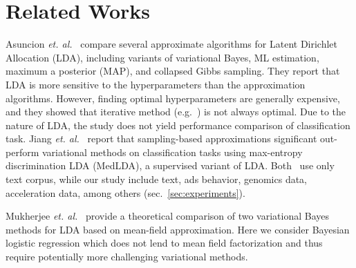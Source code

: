 \section{Related Works}

Asuncion {\it et. al.}~\cite{Asuncion2009smoothing} compare several
approximate algorithms for Latent Dirichlet Allocation (LDA), including
variants of variational Bayes, ML estimation, maximum a posterior (MAP), and
collapsed Gibbs sampling. They report that LDA is more sensitive to the
hyperparameters than the approximation algorithms. However, finding optimal
hyperparameters are generally expensive, and they showed that iterative method
(e.g.~\cite{Minka00}) is not always optimal. Due to the nature of LDA, the
study does not yield performance comparison of classification task. Jiang {\it
et. al.}~\cite{medlda_MCMC12} report that sampling-based approximations
significant out-perform variational methods on classification tasks using
max-entropy discrimination LDA (MedLDA), a supervised variant of LDA.
Both~\cite{Asuncion2009smoothing, medlda_MCMC12} use only text corpus, while
our study include text, ads behavior, genomics data, acceleration data, among
others (sec.~\ref{sec:experiments}). 

Mukherjee {\it et. al.}~\cite{Mukherjee08} provide a theoretical comparison of
two variational Bayes methods for LDA based on mean-field approximation. Here
we consider Bayesian logistic regression which does not lend to mean field
factorization and thus require potentially more challenging variational
methods. 

